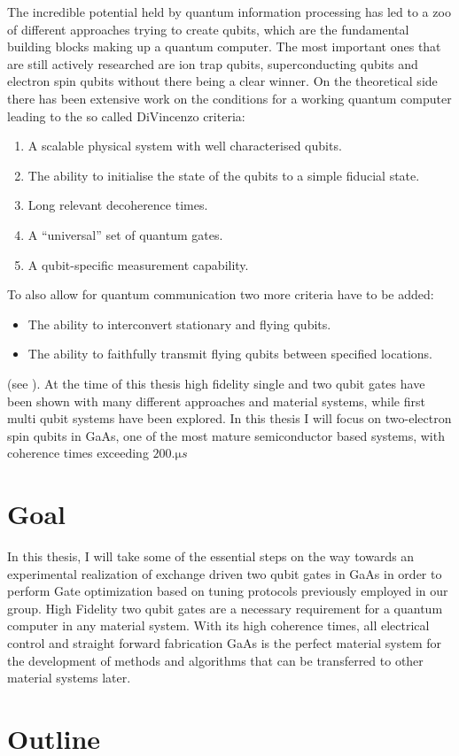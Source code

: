 The incredible potential held by quantum information processing has led to a zoo of different approaches trying to create qubits, which are the fundamental building blocks making up a quantum computer. The most important ones that are still actively researched are ion trap qubits, superconducting qubits and electron spin qubits without there being a clear winner. 
On the theoretical side there  has been extensive work on the conditions for a working quantum computer leading to the so called DiVincenzo criteria:
\begin{enumerate}
    \item A scalable physical system with well characterised qubits.
    \item The ability to initialise the state of the qubits to a simple fiducial state.
    \item Long relevant decoherence times.
    \item A “universal” set of quantum gates.
    \item A qubit-specific measurement capability.
\end{enumerate}
To also allow for quantum communication two more criteria have to be added:
\begin{itemize}
    \item The ability to interconvert stationary and flying qubits.
    \item The ability to faithfully transmit flying qubits between specified locations.
\end{itemize}
(see ). 
At the time of this thesis high fidelity single and two qubit gates have been shown with many different approaches and material systems, while first multi qubit systems have been explored.
In this thesis I will focus on two-electron spin qubits in GaAs, one of the most mature semiconductor based systems, with coherence times exceeding $\si{200.\micro s}$



\section{Goal}
In this thesis, I will take some of the essential steps on the way towards an experimental realization of exchange driven two qubit gates in GaAs in order to perform Gate optimization based on tuning protocols previously employed in our group. 
High Fidelity two qubit gates are a necessary requirement for a quantum computer in any material system. With its high coherence times, all electrical control and straight forward fabrication GaAs is the perfect material system for the development of methods and algorithms that can be transferred to other material systems later.


\section{Outline}

 

